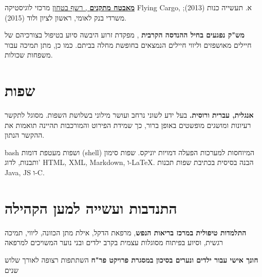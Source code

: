 {\href{https://www.dropbox.com/s/kr5rcui1zgp35i0/recommendation-letter-security-guard.jpg?dl=0}{\textbf{מאבטח מתקנים} , רשף בטחון}}
{מרכזי לוגיסטיקה Flying Cargo, א. תעשייה כנות (2013); משרדי בנק לאומי, ראשון לציון ולוד (2015).}
{}

{\textbf{מש"ק נפגעים בחיל ההנדסה הקרבית} , מפקדת זרוע היבשה}
{סיוע בטיפול בצורכיהם של חיילים מאושפזים וליווי חיילים הנמצאים בחופשת מחלה בביתם. כמו כן, מתן תמיכה עבור משפחות שכולות.}
{}

\section{שפות}

{\textbf{אנגלית, עברית ורוסית.} בעל ידע לשוני נרחב ועושר מילוני בשלושת השפות. מסוגל לתקשר רעיונות ומושגים מופשטים באופן ברור, כך שמידת הפירוט והמורכבות תהיינה תואמות את ההקשר הנתון.} 
{}
{}

{bash
ושפות מעטפת דומות (shell) המיוחסות למערכות הפעלה דמויות יוניקס. שפות סימון ותבנות, לדוג' HTML, XML, Markdown, ו-LaTeX.
הבנה בסיסית בכתיבת שפות תכנות Java, JS ו-C.}
{}
{}
\section{התנדבות ועשייה למען הקהילה}

{\textbf{התלמדות טיפולית במרכז בריאות הנפש}, מרפאת הדקל, אילת}
{מתן הכוונה, ליווי, תמיכה רגשית, וסיוע בפיתוח מסוגלות עצמית בקרב ילדים ובני נוער המשויכים למרפאה}
{}

{\textbf{חונך אישי עבור ילדים ונערים בסיכון במסגרת פרויקט פר"ח}}
{השתתפות רצופה לאורך שלוש שנים}
{}		
\unsetRTL